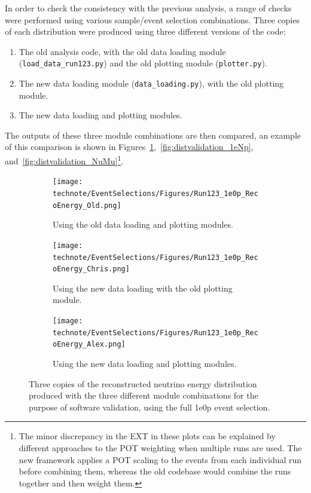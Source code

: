 In order to check the consistency with the previous analysis, a range of checks were performed using various sample/event selection combinations. Three copies of each distribution were produced using three different versions of the code:
%
\begin{enumerate}
    \item The old analysis code, with the old data loading module (\verb|load_data_run123.py|) and the old plotting module (\verb|plotter.py|).
    \item The new data loading module (\verb|data_loading.py|), with the old plotting module.
    \item The new data loading and plotting modules.
\end{enumerate}
%
The outputs of these three module combinations are then compared, an example of this comparison is shown in Figures~\ref{fig:distvalidation_1e0p},~\ref{fig:distvalidation_1eNp}, and~\ref{fig:distvalidation_NuMu}\footnote{The minor discrepancy in the EXT in these plots can be explained by different approaches to the POT weighting when multiple runs are used. The new framework applies a POT scaling to the events from each individual run before combining them, whereas the old codebase would combine the runs together and then weight them.}.
%
\begin{figure}[H]
 \centering
    \begin{subfigure}[t]{0.32\linewidth}
        \texttt{[image: technote/EventSelections/Figures/Run123\_1e0p\_RecoEnergy\_Old.png]}
        \caption{Using the old data loading and plotting modules.}
    \end{subfigure}%
    \hspace{0.3cm}%
    \begin{subfigure}[t]{0.32\linewidth}
        \texttt{[image: technote/EventSelections/Figures/Run123\_1e0p\_RecoEnergy\_Chris.png]}%
        \caption{Using the new data loading with the old plotting module.}
    \end{subfigure}%
    \hspace{0.3cm}%
    \begin{subfigure}[t]{0.31\linewidth}
        \texttt{[image: technote/EventSelections/Figures/Run123\_1e0p\_RecoEnergy\_Alex.png]}
        \caption{Using the new data loading and plotting modules.}
    \end{subfigure}%
    \caption{Three copies of the reconstructed neutrino energy distribution produced with the three different module combinations for the purpose of software validation, using the full 1e0p event selection.}
    \label{fig:distvalidation_1e0p}
\end{figure}

